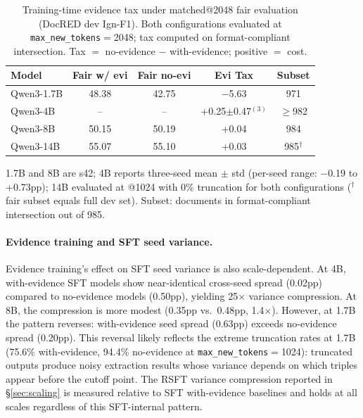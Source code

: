 \begin{table}[t]
\centering
\caption{Training-time evidence tax under matched@2048 fair evaluation (DocRED dev Ign-F1). Both configurations evaluated at \texttt{max\_new\_tokens}$=$2048; tax computed on format-compliant intersection. Tax $=$ no-evidence $-$ with-evidence; positive $=$ cost.}
\label{tab:training_tax}
\small
\begin{tabular}{lcccc}
\toprule
\textbf{Model} & \textbf{Fair w/ evi} & \textbf{Fair no-evi} & \textbf{Evi Tax} & \textbf{Subset} \\
\midrule
Qwen3-1.7B & 48.38 & 42.75 & $-$5.63 & 971 \\
Qwen3-4B & -- & -- & +0.25{\scriptsize$\pm$0.47}$^{(3)}$ & $\geq$982 \\
Qwen3-8B & 50.15 & 50.19 & +0.04 & 984 \\
Qwen3-14B & 55.07 & 55.10 & +0.03 & 985$^\dagger$ \\
\bottomrule
\end{tabular}
\vspace{-2mm}
{\raggedright\footnotesize 1.7B and 8B are s42; 4B reports three-seed mean $\pm$ std (per-seed range: $-$0.19 to +0.73pp); 14B evaluated at @1024 with 0\% truncation for both configurations ($^\dagger$fair subset equals full dev set). Subset: documents in format-compliant intersection out of 985.\par}
\end{table}

\paragraph{Evidence training and SFT seed variance.}
Evidence training's effect on SFT seed variance is also scale-dependent. At 4B, with-evidence SFT models show near-identical cross-seed spread (0.02pp) compared to no-evidence models (0.50pp), yielding 25$\times$ variance compression. At 8B, the compression is more modest (0.35pp vs.\ 0.48pp, 1.4$\times$). However, at 1.7B the pattern reverses: with-evidence seed spread (0.63pp) exceeds no-evidence spread (0.20pp). This reversal likely reflects the extreme truncation rates at 1.7B (75.6\% with-evidence, 94.4\% no-evidence at \texttt{max\_new\_tokens}$=$1024): truncated outputs produce noisy extraction results whose variance depends on which triples appear before the cutoff point. The RSFT variance compression reported in \S\ref{sec:scaling} is measured relative to SFT with-evidence baselines and holds at all scales regardless of this SFT-internal pattern.


